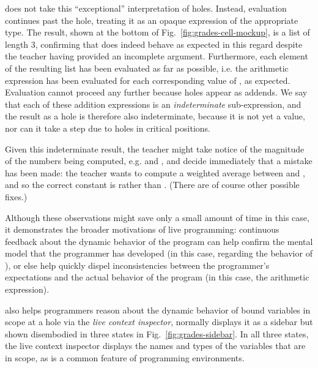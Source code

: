 \Hazel{} does not take this ``exceptional'' interpretation of holes. Instead, evaluation continues past the hole, treating it as an opaque expression of the appropriate type. The result, shown at the bottom of Fig.~\ref{fig:grades-cell-mockup}, is a list of length $3$, confirming that  does indeed behave as expected in this regard despite the teacher having provided an incomplete argument. Furthermore, each element of the resulting list has been evaluated as far as possible, i.e. the arithmetic expression  has been evaluated for each corresponding value of , as expected. Evaluation cannot proceed any further because holes appear as addends. We say that each of these addition expressions is an \emph{indeterminate} sub-expression, and the result as a hole is therefore also indeterminate, because it is not yet a value, nor can it take a step due to holes in critical positions.

Given this indeterminate result, the teacher might take notice of the magnitude of the numbers being computed, e.g.  and , and
decide immediately that a mistake has been made: the teacher wants to compute a 
weighted average between  and , and so the correct
constant is  rather than . (There are of course other possible fixes.)

Although these observations might 
save only a small amount of time in this case, 
it demonstrates
the broader motivations of live programming: continuous feedback about the dynamic behavior of the 
program can help confirm the mental model 
that the programmer has developed (in this case, regarding the behavior of ), or else help quickly dispel 
inconsistencies between the programmer's expectations and the 
actual behavior of the program (in this case, the arithmetic expression).

\Hazel also helps programmers reason about the dynamic behavior of bound variables in scope at a hole via the \emph{live context inspector}, normally displays it as a sidebar but shown disembodied in three states in Fig.~\ref{fig:grades-sidebar}. 
In all three states, the live context inspector displays the names and types of the variables that are in scope, as is a common feature of programming environments.

